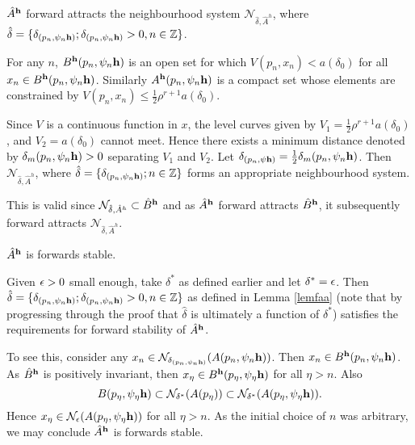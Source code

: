 \begin{lemma} \hfill \\
\label{lemfaa}
$\hat{A}^{{\bf h}}$ forward attracts the neighbourhood system
$\mathcal{N}_{\hat{\delta}, \hat{A}^{h}}$, where \hfill \\ $\hat{\delta} = \{
\delta_{(p_n, \psi_n{\bf h})}  ; \delta_{(p_n, \psi_n{\bf h})} > 0, n \in
\mathbb{Z} \}$.
\end{lemma}
\begin{prf}
For any $n$,  $B^{{\bf h}}(p_n, \psi_n{\bf h})$ is an open set for which
$V(p_n, x_n) < a(\delta_0)$ for all $x_n \in B^{{\bf h}}(p_n, \psi_n{\bf h})$.
Similarly $A^{{\bf h}}(p_n, \psi_n{\bf h})$ is a compact set whose elements are
constrained by $V(p_n, x_n) \leq \frac{1}{2} \rho^{r+1} a(\delta_0)$.

Since $V$ is a continuous function in $x$, the level curves given
by $V_1 = \frac{1}{2} \rho^{r+1} a(\delta_0)$, and $V_2 =
a(\delta_0)$ cannot meet. Hence there exists a minimum distance
denoted by $\delta_m(p_n, \psi_n{\bf h}) > 0$ separating $V_1$ and $V_2$.
Let $\delta_{(p_n, \psi{\bf h})} = \frac{1}{2} \delta_m(p_n, \psi_n{\bf h})$.
Then $\mathcal{N}_{\hat{\delta}, \hat{A}^{h}}$, where $\hat{\delta} =
\{ \delta_{(p_n, \psi_n{\bf h})} ; n \in \mathbb{Z} \}$ forms an
appropriate neighbourhood system.

This is valid since $\mathcal{N}_{\hat{\delta}, \hat{A}^{h}} \subset
\hat{B}^{{\bf h}}$ and as $\hat{A}^{{\bf h}}$ forward attracts $\hat{B}^{{\bf
h}}$, it subsequently forward attracts $\mathcal{N}_{\hat{\delta},
\hat{A}^{h}}$.
\end{prf}

\begin{lemma}
$\hat{A}^{{\bf h}}$ is forwards stable.
\end{lemma}
\begin{prf}
Given $\epsilon > 0$ small enough, take $\delta^*$ as defined earlier and let
$\delta^* = \epsilon$. Then $\hat{\delta}
= \{ \delta_{(p_n, \psi_n{\bf h})} ; \delta_{(p_n, \psi_n{\bf h})} > 0, n \in
\mathbb{Z} \}$ as defined in Lemma \ref{lemfaa} (note that by progressing
through the proof that $\hat{\delta}$ is ultimately a function of $\delta^*$)
satisfies the requirements for forward stability of $\hat{A}^{{\bf h}}$.

To see this, consider any $x_n \in
\mathcal{N}_{\delta_{(p_n, \psi_n {\bf h})}}(A(p_n, \psi_n {\bf h}))$. Then $x_n
\in B^{{\bf h}}(p_n, \psi_n {\bf h})$. As $\hat{B}^{{\bf h}}$ is positively
invariant, then $x_{\eta} \in B^{\bf h}(p_{\eta}, \psi_{\eta} {\bf h})$ for all
${\eta} > n$. Also
\[ B(p_{\eta}, \psi_{\eta} {\bf h}) \subset
\mathcal{N}_{\delta^*}(A(p_{\eta})) \subset \mathcal{N}_{\delta^*}(A(p_{\eta},
            \psi_{\eta} {\bf h} )). \]
Hence $x_{\eta} \in \mathcal{N}_{\epsilon}(A(p_{\eta}, \psi_{\eta} {\bf
h} ))$ for all ${\eta} > n$. As the initial choice of $n$ was
arbitrary, we may conclude $\hat{A}^{{\bf h}}$ is forwards stable.
\end{prf}

